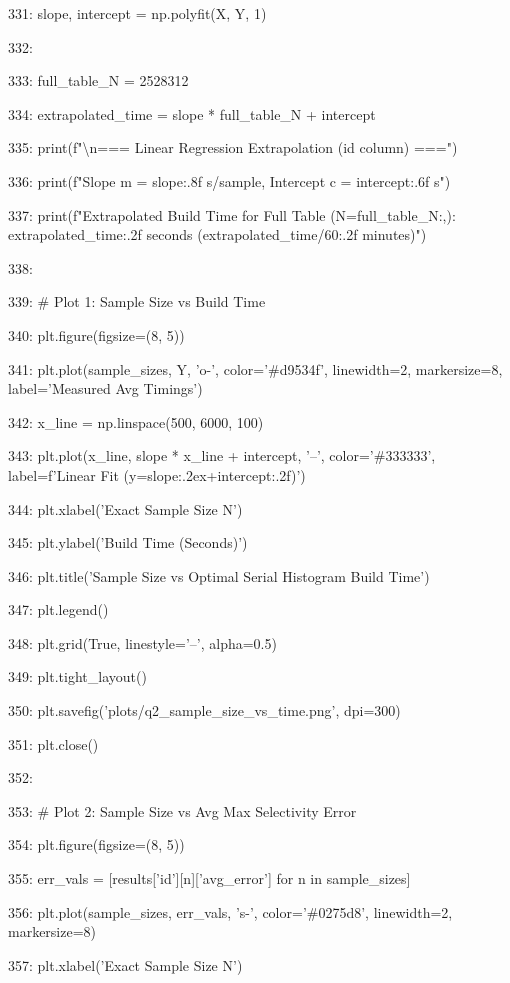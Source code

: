 \documentclass[11pt,a4paper]{article}
\begin{document}
331:     slope, intercept = np.polyfit(X, Y, 1)

332:

333:     full\_table\_N = 2528312

334:     extrapolated\_time = slope * full\_table\_N + intercept

335:     print(f"\textbackslash{}n=== Linear Regression Extrapolation (id column) ===")

336:     print(f"Slope m = {slope:.8f} s/sample, Intercept c = {intercept:.6f} s")

337:     print(f"Extrapolated Build Time for Full Table (N={full\_table\_N:,}): {extrapolated\_time:.2f} seconds ({extrapolated\_time/60:.2f} minutes)")

338:

339:     \# Plot 1: Sample Size vs Build Time

340:     plt.figure(figsize=(8, 5))

341:     plt.plot(sample\_sizes, Y, 'o-', color='\#d9534f', linewidth=2, markersize=8, label='Measured Avg Timings')

342:     x\_line = np.linspace(500, 6000, 100)

343:     plt.plot(x\_line, slope * x\_line + intercept, '--', color='\#333333', label=f'Linear Fit (y={slope:.2e}x+{intercept:.2f})')

344:     plt.xlabel('Exact Sample Size N')

345:     plt.ylabel('Build Time (Seconds)')

346:     plt.title('Sample Size vs Optimal Serial Histogram Build Time')

347:     plt.legend()

348:     plt.grid(True, linestyle='--', alpha=0.5)

349:     plt.tight\_layout()

350:     plt.savefig('plots/q2\_sample\_size\_vs\_time.png', dpi=300)

351:     plt.close()

352:

353:     \# Plot 2: Sample Size vs Avg Max Selectivity Error

354:     plt.figure(figsize=(8, 5))

355:     err\_vals = [results['id'][n]['avg\_error'] for n in sample\_sizes]

356:     plt.plot(sample\_sizes, err\_vals, 's-', color='\#0275d8', linewidth=2, markersize=8)

357:     plt.xlabel('Exact Sample Size N')
\end{document}
